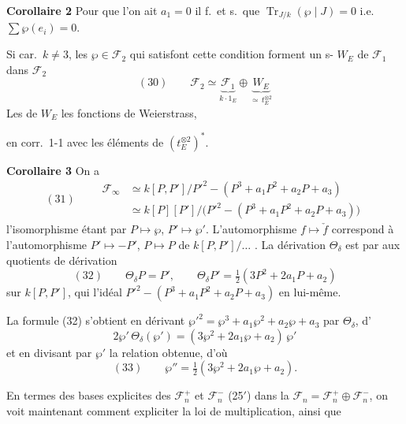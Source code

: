 \documentclass[11pt,a4paper]{article}
\begin{document}
\textbf{Corollaire 2} \quad Pour que l'on ait $a_1 = 0$ il f.\ et s.\ que
$\operatorname{Tr}_{J/k}(\wp \mid J) = 0$ i.e.\ $\sum \wp(e_i) = 0$.

Si car.\ $k \neq 3$, les $\wp \in \mathcal{F}_2$ qui satisfont cette condition
forment un s- $W_E$ de $\mathcal{F}_1$ dans $\mathcal{F}_2$
\[
  (30) \qquad \mathcal{F}_2 \simeq \underbrace{\mathcal{F}_1}_{k \cdot 1_E} \oplus
  \underbrace{W_E}_{\simeq\, t_E^{\otimes 2}}
\]
Les   de $W_E$  
 les fonctions de Weierstrass,

en corr.\ 1-1 avec les éléments de $(t_E^{\otimes 2})^*$.

\textbf{Corollaire 3} \quad On a
\[
  (31) \qquad
  \begin{aligned}
    \mathcal{F}_\infty &\simeq k[P, P'] \big/ P'^2 - (P^3 + a_1 P^2 + a_2 P + a_3) \\
    &\simeq k[P][P'] \big/ \bigl(P'^2 - (P^3 + a_1 P^2 + a_2 P + a_3)\bigr)
  \end{aligned}
\]
l'isomorphisme étant  par $P \mapsto \wp$, $P' \mapsto \wp'$.
L'automorphisme $f \mapsto \check f$ correspond à l'automorphisme
$P' \mapsto -P'$, $P \mapsto P$ de $k[P, P']/\ldots$ . La dérivation
$\Theta_\delta$ est  par  aux quotients de
  dérivation
\[
  (32) \qquad \Theta_\delta P = P', \qquad \Theta_\delta P' = \tfrac12 (3P^2 + 2a_1 P + a_2)
\]
sur $k[P, P']$, qui  l'idéal
$P'^2 - (P^3 + a_1 P^2 + a_2 P + a_3)$ en lui-même.

La formule (32) s'obtient en dérivant
$\wp'^2 = \wp^3 + a_1 \wp^2 + a_2 \wp + a_3$ par $\Theta_\delta$,
 d'
\[
  2\wp'\, \Theta_\delta(\wp') = (3\wp^2 + 2a_1 \wp + a_2)\, \wp'
\]
et en divisant par $\wp'$ la relation obtenue, d'où
\[
  (33) \qquad \wp'' = \tfrac12 (3\wp^2 + 2a_1 \wp + a_2) .
\]

\textbf{}  \quad En termes des bases
explicites des $\mathcal{F}_n^+$ et $\mathcal{F}_n^-$ (25$'$) dans la 
$\mathcal{F}_n = \mathcal{F}_n^+ \oplus \mathcal{F}_n^-$, on voit maintenant comment
expliciter la loi de multiplication,  ainsi que
\end{document}
